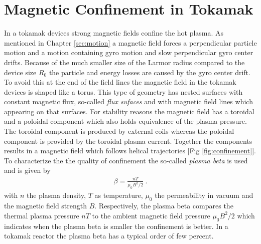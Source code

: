 \newpage
\section{Magnetic Confinement in Tokamak}
\label{sec:confinement}

In a tokamak devices strong magnetic fields confine the hot plasma. As mentioned in Chapter \ref{sec:motion} a magnetic field forces a perpendicular particle motion and a motion containing gyro motion and slow perpendicular gyro center drifts. Because of the much smaller size of the Larmor radius compared to the device size $R_0$ the particle and energy losses are caused by the gyro center drift. To avoid this at the end of the field lines the magnetic field in the tokamak devices is shaped like a torus. This type of geometry has nested surfaces with constant magnetic flux, so-called \textit{flux sufaces} and with magnetic field lines which appearing on that surfaces. For stability reasons the magnetic field has a toroidal and a poloidal component which also holds equivalence of the plasma pressure. \cite{Stroth2011, Wesson2011} The toroidal component is produced by external coils whereas the poloidal component is provided by the toroidal plasma current. Together the components results in a magnetic field which follows helical trajectories [Fig \ref{fig:confinement}]. To characterize the the quality of confinement the so-called \textit{plasma beta} is used and is given by
\begin{gather}
    \beta = \frac{nT}{\mu_0 B^2/2}~.
\end{gather} 
with $n$ the plasma density, $T$ as temperature, $\mu_0$ the permeability in vacuum and the magnetic field strength $B$. Respectively, the plasma beta compares the thermal plasma pressure $nT$ to the ambient magnetic field pressure $\mu_0 B^2/2$ which indicates when the plasma beta is smaller the confinement is better. In a tokamak reactor the plasma beta has a typical order of few percent. \cite{Wesson2011}
